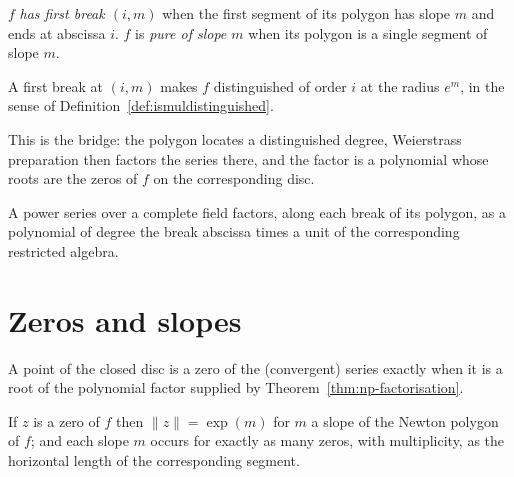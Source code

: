 \begin{definition}
  \label{def:hasfirstbreak}
  \leanok
  $f$ \emph{has first break $(i, m)$} when the first segment of its polygon has slope $m$ and
  ends at abscissa $i$.  $f$ is \emph{pure of slope $m$} when its polygon is a single segment of
  slope $m$.
\end{definition}

\begin{proposition}
  \label{prop:firstbreak-distinguished}
  \leanok
  A first break at $(i, m)$ makes $f$ distinguished of order $i$ at the radius $e^{m}$, in the
  sense of Definition~\ref{def:ismuldistinguished}.
\end{proposition}

This is the bridge: the polygon locates a distinguished degree, Weierstrass preparation then
factors the series there, and the factor is a polynomial whose roots are the zeros of $f$ on the
corresponding disc.

\begin{theorem}
  \label{thm:np-factorisation}
  \leanok
  A power series over a complete field factors, along each break of its polygon, as a polynomial
  of degree the break abscissa times a unit of the corresponding restricted algebra.
\end{theorem}

\section{Zeros and slopes}

\begin{theorem}
  \label{thm:np-zeros}
  \leanok
  A point of the closed disc is a zero of the (convergent) series exactly when it is a root of
  the polynomial factor supplied by Theorem~\ref{thm:np-factorisation}.
\end{theorem}

\begin{theorem}
  \label{thm:np-slope-reading}
  \leanok
  If $z$ is a zero of $f$ then $\lVert z \rVert = \exp(m)$ for $m$ a slope of the Newton polygon
  of $f$; and each slope $m$ occurs for exactly as many zeros, with multiplicity, as the
  horizontal length of the corresponding segment.
\end{theorem}

